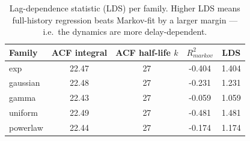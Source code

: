 \begin{table}[h]
\centering
\caption{Lag-dependence statistic (LDS) per family. Higher LDS means full-history regression beats Markov-fit by a larger margin --- i.e.\ the dynamics are more delay-dependent.}
\label{tab:lds}
\begin{tabular}{lcccc}
\toprule
Family & ACF integral & ACF half-life $k$ & $R^2_{markov}$ & LDS \\
\midrule
exp & 22.47 & 27 & -0.404 & 1.404 \\
gaussian & 22.48 & 27 & -0.231 & 1.231 \\
gamma & 22.43 & 27 & -0.059 & 1.059 \\
uniform & 22.49 & 27 & -0.481 & 1.481 \\
powerlaw & 22.44 & 27 & -0.174 & 1.174 \\
\bottomrule
\end{tabular}
\end{table}
